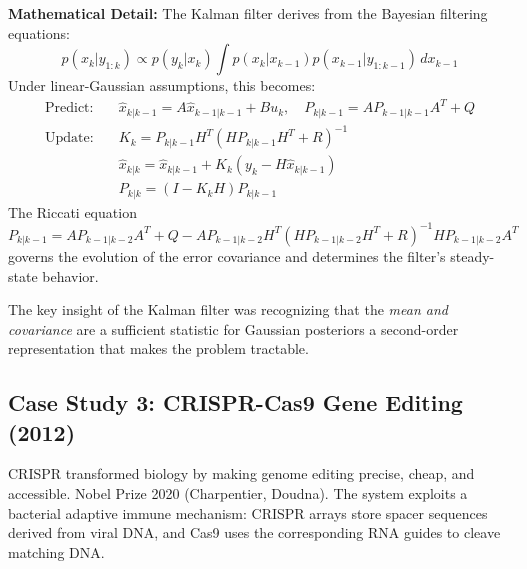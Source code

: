 \textbf{Mathematical Detail:} The Kalman filter derives from the Bayesian filtering equations:
\[
p(x_k | y_{1:k}) \propto p(y_k | x_k) \int p(x_k | x_{k-1}) p(x_{k-1} | y_{1:k-1}) \, dx_{k-1}
\]
Under linear-Gaussian assumptions, this becomes:
\begin{align*}
\text{Predict:}\quad & \hat{x}_{k|k-1} = A\hat{x}_{k-1|k-1} + Bu_k, \quad P_{k|k-1} = AP_{k-1|k-1}A^T + Q \\
\text{Update:}\quad & K_k = P_{k|k-1}H^T(HP_{k|k-1}H^T + R)^{-1} \\
& \hat{x}_{k|k} = \hat{x}_{k|k-1} + K_k(y_k - H\hat{x}_{k|k-1}) \\
& P_{k|k} = (I - K_kH)P_{k|k-1}
\end{align*}
The Riccati equation $P_{k|k-1} = A P_{k-1|k-2} A^T + Q - A P_{k-1|k-2} H^T (H P_{k-1|k-2} H^T + R)^{-1} H P_{k-1|k-2} A^T$ governs the evolution of the error covariance and determines the filter's steady-state behavior.

The key insight of the Kalman filter was recognizing that the \emph{mean and covariance} are a sufficient statistic for Gaussian posteriors a second-order representation that makes the problem tractable.

\subsection{Case Study 3: CRISPR-Cas9 Gene Editing (2012)}

CRISPR transformed biology by making genome editing precise, cheap, and accessible. Nobel Prize 2020 (Charpentier, Doudna). The system exploits a bacterial adaptive immune mechanism: CRISPR arrays store spacer sequences derived from viral DNA, and Cas9 uses the corresponding RNA guides to cleave matching DNA.

